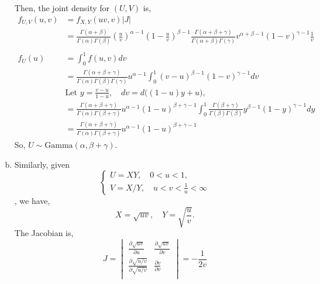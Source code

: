 \documentclass[letterpaper]{article}
\begin{document}
\begin{enumerate}[(a)]
    Then, the joint density for $(U, V)$ is,
    \begin{align*}
    f_{U,V}(u, v) & = f_{X,Y}(uv, v)|J| \\
    & = \frac{\Gamma(\alpha+\beta)}{\Gamma(\alpha)\Gamma(\beta)} \left(\frac{u}{v}\right)^{\alpha-1} (1-\frac{u}{v})^{\beta-1} \frac{\Gamma(\alpha+\beta+\gamma)}{\Gamma(\alpha+\beta)\Gamma(\gamma)} v^{\alpha+\beta-1} (1-v)^{\gamma-1} \frac{1}{v} \\
    \\
    f_U(u) & = \int_0^1 f(u,v)dv \\
    & = \frac{\Gamma(\alpha+\beta+\gamma)}{\Gamma(\alpha)\Gamma(\beta)\Gamma(\gamma)} u^{\alpha-1} \int_0^1 (v-u)^{\beta-1}(1-v)^{\gamma-1} dv \\
    & \text{Let $y = \frac{v-u}{1-u}, \quad dv = d\big((1-u)y+u\big)$},\\
    & = \frac{\Gamma(\alpha+\beta+\gamma)}{\Gamma(\alpha)\Gamma(\beta+\gamma)} u^{\alpha-1} (1-u)^{\beta+\gamma-1} \int_0^1 \frac{\Gamma(\beta+\gamma)}{\Gamma(\beta)\Gamma(\beta)} y^{\beta-1} (1-y)^{\gamma-1} dy \\
    & = \frac{\Gamma(\alpha+\beta+\gamma)}{\Gamma(\alpha)\Gamma(\beta+\gamma)} u^{\alpha-1} (1-u)^{\beta+\gamma-1} 
    \end{align*}
    So, $U \sim \text{Gamma}(\alpha, \beta+\gamma)$.
    \item Similarly, given 
    \[
    \begin{cases}
    U = XY,  \quad 0 < u < 1, \\
    V = X/Y, \quad u < v < \frac{1}{u} < \infty
    \end{cases}
    \]
    , we have, 
    \[
    X = \sqrt{uv}, \quad Y = \sqrt{\frac{u}{v}}.
    \]
    The Jacobian is,
    \[
    J = \begin{vmatrix}
    \frac{\partial \sqrt{uv}}{\partial u} & \frac{\partial \sqrt{uv}}{\partial v} \\
    \frac{\partial \sqrt{u/v}}{\partial \sqrt{u/v}} & \frac{\partial v}{\partial v} \\
    \end{vmatrix} = -\frac{1}{2v}
    \]


\end{enumerate}
\end{document}
